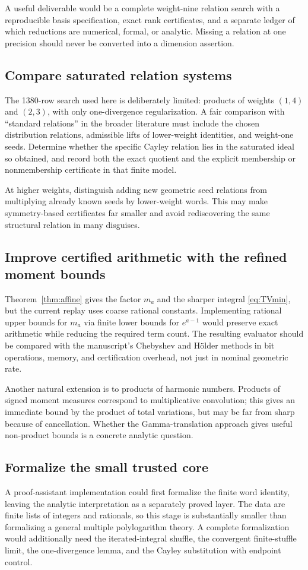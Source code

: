 \documentclass[11pt,letterpaper]{article}
\numberwithin{equation}{section}
\theoremstyle{definition}
\begin{document}
A useful deliverable would be a complete weight-nine relation search
with a reproducible basis specification, exact rank certificates,
and a separate ledger of which reductions are numerical, formal,
or analytic. Missing a relation at one precision should never be
converted into a dimension assertion.

\subsection{Compare saturated relation systems}
The 1380-row search used here is deliberately limited: products of
weights $(1,4)$ and $(2,3)$, with only one-divergence regularization.
A fair comparison with ``standard relations'' in the broader literature
must include the chosen distribution relations, admissible lifts of
lower-weight identities, and weight-one seeds. Determine whether the
specific Cayley relation lies in the saturated ideal so obtained,
and record both the exact quotient and the explicit membership or
nonmembership certificate in that finite model.

At higher weights, distinguish adding new geometric seed relations from
multiplying already known seeds by lower-weight words. This may make
symmetry-based certificates far smaller and avoid rediscovering the
same structural relation in many disguises.

\subsection{Improve certified arithmetic with the refined moment bounds}
Theorem~\ref{thm:affine} gives the factor $m_a$ and the sharper integral
\eqref{eq:TVmin}, but the current replay uses coarse rational constants.
Implementing rational upper bounds for $m_a$ via finite lower bounds
for $e^{a-1}$ would preserve exact arithmetic while reducing the
required term count. The resulting evaluator should be compared with
the manuscript's Chebyshev and H\"older methods in bit operations,
memory, and certification overhead, not just in nominal geometric
rate.

Another natural extension is to products of harmonic numbers. Products
of signed moment measures correspond to multiplicative convolution;
this gives an immediate bound by the product of total variations,
but may be far from sharp because of cancellation. Whether the
Gamma-translation approach gives useful non-product bounds is a
concrete analytic question.

\subsection{Formalize the small trusted core}
A proof-assistant implementation could first formalize the finite word
identity, leaving the analytic interpretation as a separately proved
layer. The data are finite lists of integers and rationals, so this
stage is substantially smaller than formalizing a general multiple
polylogarithm theory. A complete formalization would additionally need
the iterated-integral shuffle, the convergent finite-stuffle limit,
the one-divergence lemma, and the Cayley substitution with endpoint
control.
\end{document}
